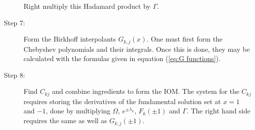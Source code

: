 \documentclass{article}
\begin{document}
\begin{description}
Right multiply this Hadamard product by $\Gamma$.
\item[Step 7:] Form the Birkhoff interpolants $G_{k,j}(x)$.
One must first form the Chebyshev polynomials and their integrals.
Once this is done, they may be calculated with the formulas given in equation (\ref{eq:G functions}).
\item[Step 8:] Find $C_{kj}$ and combine ingredients to form the IOM.
The system for the $C_{kj}$ requires storing the derivatives of the fundamental solution set at $x=1$ and $-1$, done by multiplying $\Omega$, $e^{\pm \lambda_k}$, $F_k(\pm 1)$ and $\Gamma$.
The right hand side requires the same as well as $G_{k,j}(\pm 1)$.
\end{description}
\end{document}

